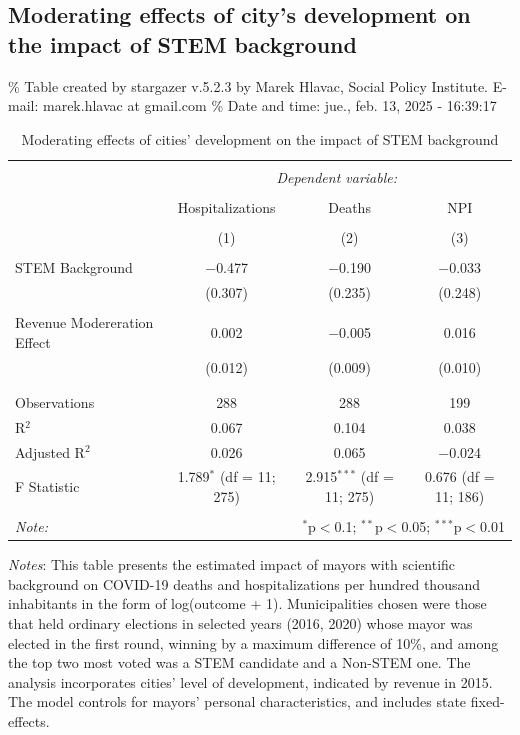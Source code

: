 \documentclass[
  letterpaper,
  DIV=11,
  numbers=noendperiod]{scrartcl}
\begin{document}
\subsection{Moderating effects of city's development on the impact of
STEM
background}\label{moderating-effects-of-citys-development-on-the-impact-of-stem-background}

\% Table created by stargazer v.5.2.3 by Marek Hlavac, Social Policy
Institute. E-mail: marek.hlavac at gmail.com \% Date and time: jue.,
feb. 13, 2025 - 16:39:17

\begin{table}[!htbp] \centering 
  \caption{Moderating effects of cities’ development on the impact of STEM background} 
  \label{} 
\begin{tabular}{@{\extracolsep{5pt}}lccc} 
\\[-1.8ex]\hline 
\hline \\[-1.8ex] 
 & \multicolumn{3}{c}{\textit{Dependent variable:}} \\ 
\cline{2-4} 
\\[-1.8ex] & Hospitalizations & Deaths & NPI \\ 
\\[-1.8ex] & (1) & (2) & (3)\\ 
\hline \\[-1.8ex] 
 STEM Background & $-$0.477 & $-$0.190 & $-$0.033 \\ 
  & (0.307) & (0.235) & (0.248) \\ 
  & & & \\ 
 Revenue Modereration Effect & 0.002 & $-$0.005 & 0.016 \\ 
  & (0.012) & (0.009) & (0.010) \\ 
  & & & \\ 
\hline \\[-1.8ex] 
Observations & 288 & 288 & 199 \\ 
R$^{2}$ & 0.067 & 0.104 & 0.038 \\ 
Adjusted R$^{2}$ & 0.026 & 0.065 & $-$0.024 \\ 
F Statistic & 1.789$^{*}$ (df = 11; 275) & 2.915$^{***}$ (df = 11; 275) & 0.676 (df = 11; 186) \\ 
\hline 
\hline \\[-1.8ex] 
\textit{Note:}  & \multicolumn{3}{r}{$^{*}$p$<$0.1; $^{**}$p$<$0.05; $^{***}$p$<$0.01} \\ 
\end{tabular} 
\end{table}

\emph{Notes}: This table presents the estimated impact of mayors with
scientific background on COVID-19 deaths and hospitalizations per
hundred thousand inhabitants in the form of log(outcome + 1).
Municipalities chosen were those that held ordinary elections in
selected years (2016, 2020) whose mayor was elected in the first round,
winning by a maximum difference of 10\%, and among the top two most
voted was a STEM candidate and a Non-STEM one. The analysis incorporates
cities' level of development, indicated by revenue in 2015. The model
controls for mayors' personal characteristics, and includes state
fixed-effects.
\end{document}
